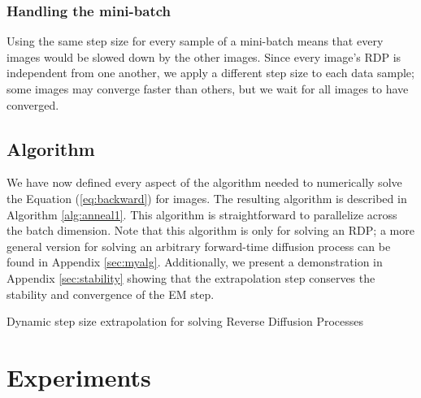 \documentclass{article}
\begin{document}
\subsubsection{Handling the mini-batch}

Using the same step size for every sample of a mini-batch means that every images would be slowed down by the other images. 
Since every image's RDP is independent from one another, we apply a different step size to each data sample; some images may converge faster than others, but we wait for all images to have converged. 

\subsection{Algorithm}

We have now defined every aspect of the algorithm needed to numerically solve the Equation (\ref{eq:backward}) for images. The resulting algorithm is described in Algorithm \ref{alg:anneal1}. This algorithm is straightforward to parallelize across the batch dimension.
Note that this algorithm is only for solving an RDP; a more general version for solving an arbitrary forward-time diffusion process can be found in Appendix \ref{sec:myalg}. Additionally, we present a demonstration in Appendix \ref{sec:stability} showing that the extrapolation step conserves the stability and convergence of the EM step.

\begin{algorithm}
	\caption{Dynamic step size extrapolation for solving Reverse Diffusion Processes}
	\label{alg:anneal1}
	\begin{algorithmic}
	    \Require{} 
        \State{}
        \State{}
        \State{}
        \While{}
            \State{} 
            \State{}
            \State{} 
            \State{} 
            \State{}
            \If{} 
                \State{} 
                \State{}
                \State{}
            \EndIf
{}
        \EndWhile
        \Return{}
        
	\end{algorithmic}
\end{algorithm}

\section{Experiments}
\end{document}
